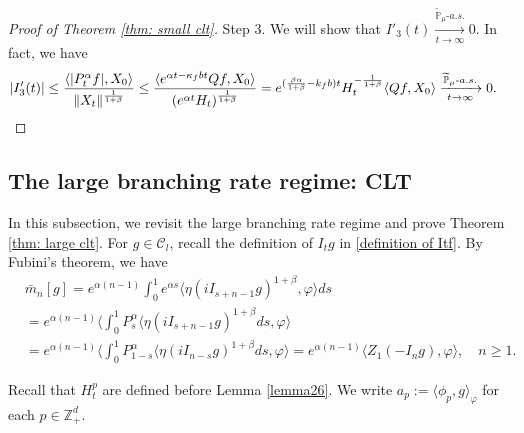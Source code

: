 \documentclass[12pt,a4paper]{amsart}
\theoremstyle{plain}
\theoremstyle{definition}
\numberwithin{equation}{section}
\begin{document}
\begin{proof}[Proof of Theorem \ref{thm: small clt}]
	Step 3. We will show that $I'_3(t) \xrightarrow[t\to \infty]{\widetilde {\mathbb P}_\mu \text{-} a.s.} 0$.
  In fact, we have
  \begin{align}
    & |I'_3(t)|
      \leq \frac{\langle |P^\alpha_tf|,X_0\rangle}{\|X_t\|^{\frac{1}{1+\beta}}}
      \leq \frac{\langle e^{\alpha t - \kappa_f b t}Qf,X_0\rangle}{(e^{\alpha t} H_t)^{\frac{1}{1+\beta}}}
    = e^{(\frac{\beta \alpha }{1+\beta} - k_fb)t} H_t^{-\frac{1}{1+\beta}} \langle Qf,X_0\rangle
    \xrightarrow[t\to \infty]{\widetilde {\mathbb P}_\mu \text{-} a.s.} 0.
    \qedhere
  \end{align}
\end{proof}

\subsection{The large branching rate regime: CLT}
\label{sec: large rate clt}
In this subsection, we revisit the large branching rate regime and prove Theorem \ref{thm: large clt}.
For $g\in \mathcal{C}_l$, recall the definition of $I_tg$ in \eqref{definition of Itf}.
By Fubini's theorem, we have
\begin{align}
  \label{equ: transform of mn}
  & \bar{m}_n[g]
    = e^{\alpha(n-1)}\int_0^1 e^{\alpha s}\langle \eta(iI_{s+n-1}g)^{1+\beta}, \varphi\rangle ds \\   
  & = e^{\alpha(n-1)}\langle \int_0^1 P_s^{\alpha}\langle \eta(iI_{s+n-1}g)^{1+\beta}ds, \varphi\rangle\\
  & =e^{\alpha(n-1)}\langle \int_0^1 P_{1-s}^{\alpha}\langle \eta(iI_{n-s}g)^{1+\beta}ds, \varphi\rangle=e^{\alpha(n-1)}\langle Z_1(-I_ng), \varphi\rangle,
    \quad n\geq 1.
\end{align}

Recall that $H^p_t$ are defined before Lemma \ref{lemma26}. We write $a_p:= \langle \phi_p, g\rangle_\varphi$ for each $p \in \mathbb Z_+^d$.
\end{document}
